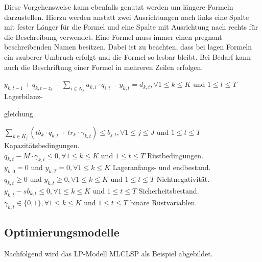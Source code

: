 \documentclass[13pt,a4paper, listof=entryprefix, bibliography=totocnumbered,toc=listofnumbered,lof=listofnumbered]{scrartcl}
\begin{document}
Diese Vorgehensweise kann ebenfalls genutzt werden um längere Formeln darzustellen. Hierzu werden anstatt zwei Ausrichtungen nach links eine Spalte mit fester Länger für die Formel und eine Spalte mit Ausrichtung nach rechts für die Beschreibung verwendet. Eine Formel muss immer einen pregnant beschreibenden Namen besitzen. Dabei ist zu beachten, dass bei lagen Formeln ein sauberer Umbruch erfolgt und die Formel so lesbar bleibt. Bei Bedarf kann auch die Beschriftung einer Formel in mehreren Zeilen erfolgen.


$y_{k,t-1} + q_{k,t-z_k} - \sum\limits_{i\in N_k}^{} a_{k,i} \cdot q_{i,t} - y_{k,t} = d_{k,t}, \forall 1 \le k \le K \text{ und } 1 \le t \le T$ \hfill Lagerbilanz-\\
\begin{flushright}
	\vspace{-1.5em}
	gleichung.
\end{flushright}
$\sum\limits_{k\in K_j}^{} (tb_k \cdot q_{k,t} + tr_k \cdot \gamma_{k,t}) \le b_{j,t}, \forall 1 \le j \le J \text{ und } 1 \le t \le T$ \hfill Kapazitätsbedingungen. \\
$q_{k,t} - M \cdot \gamma_{k,t} \le 0, \forall 1 \le k \le K \text{ und } 1 \le t \le T$ \hfill Rüstbedingungen. \\
$y_{k,0} = 0 \text{ und } y_{k,T} = 0, \forall 1 \le k \le K$  \hfill Lageranfangs- und endbestand. \\
$q_{k,t} \ge 0 \text{ und } y_{k,t} \ge 0, \forall 1 \le k \le K \text{ und } 1 \le t \le T$ \hfill Nichtnegativität. \\
$y_{k,t} - sb_{k,t}\le 0, \forall 1 \le k \le K \text{ und } 1 \le t \le T$ \hfill Sicherheitsbestand. \\
$\gamma_{k,t} \in \{0,1\}, \forall 1 \le k \le K \text{ und } 1 \le t \le T$ \hfill binäre Rüstvariablen. \\


\subsection{Optimierungsmodelle}

Nachfolgend wird das LP-Modell MLCLSP als Beispiel abgebildet.
\end{document}
